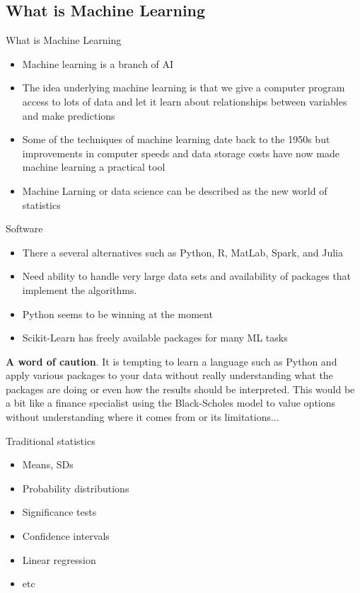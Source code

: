 \documentclass[11pt]{beamer}
\begin{document}
\subsection[subsection]{What is Machine Learning}
%
\begin{frame}{What is Machine Learning}
	\begin{itemize}
		\item Machine learning is a branch of AI
		\item The idea underlying machine learning is that we give a computer program access to lots of data and let it learn about relationships between variables and make predictions 
		\item Some of the techniques of machine learning date back to the 1950s  but improvements in computer speeds and data storage costs have now made machine learning a practical tool
		\item Machine Larning or data science can be described as the new world of statistics
	\end{itemize}
\end{frame}
\begin{frame}{Software}
	\begin{itemize}
		\item There a several alternatives such as Python, R, MatLab, Spark, and Julia 
		\item Need ability to handle very large data sets and availability of packages that implement the algorithms.
		\item Python seems to be winning at the moment
		\item Scikit-Learn has freely available packages for many ML tasks
	\end{itemize}

\begin{tcolorbox}
\textbf{A word of caution}. It is tempting to learn a language such as Python and apply various packages to your data without really understanding what the packages are doing or even how the results should be interpreted. This would be a bit like a finance specialist using the Black-Scholes model to value options without understanding where it comes from or its limitations...
\end{tcolorbox}
\end{frame}
\begin{frame}{Traditional statistics}
	\begin{itemize}
		\item Means, SDs
		\item Probability distributions
		\item Significance tests
		\item Confidence intervals
		\item Linear regression
		\item etc
	\end{itemize}
\end{frame}
\end{document}

